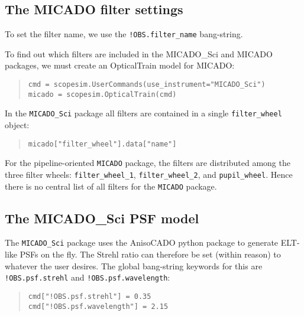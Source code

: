 \subsection{The MICADO filter settings%
  \label{the-micado-filter-settings}%
}

To set the filter name, we use the \texttt{!OBS.filter\_name} bang-string.

To find out which filters are included in the MICADO\_Sci and MICADO packages, we must create an OpticalTrain model for MICADO:

\begin{quote}
\begin{alltt}
\begin{lstlisting}[frame=single]
cmd = scopesim.UserCommands(use_instrument="MICADO_Sci")
micado = scopesim.OpticalTrain(cmd)
\end{lstlisting}
\end{alltt}
\end{quote}

In the \texttt{MICADO\_Sci} package all filters are contained in a single \texttt{filter\_wheel} object:

\begin{quote}
\begin{alltt}
\begin{lstlisting}[frame=single]
micado["filter_wheel"].data["name"]
\end{lstlisting}
\end{alltt}
\end{quote}

For the pipeline-oriented \texttt{MICADO} package, the filters are distributed among the three filter wheels:
\texttt{filter\_wheel\_1}, \texttt{filter\_wheel\_2}, and \texttt{pupil\_wheel}.
Hence there is no central list of all filters for the \texttt{MICADO} package.


\subsection{The MICADO\_Sci PSF model%
  \label{the-micado-sci-psf-model}%
}

The \texttt{MICADO\_Sci} package uses the AnisoCADO python package to generate ELT-like PSFs on the fly.
The Strehl ratio can therefore be set (within reason) to whatever the user desires.
The global bang-string keywords for this are \texttt{!OBS.psf.strehl} and \texttt{!OBS.psf.wavelength}:

\begin{quote}
\begin{alltt}
\begin{lstlisting}[frame=single]
cmd["!OBS.psf.strehl"] = 0.35
cmd["!OBS.psf.wavelength"] = 2.15
\end{lstlisting}
\end{alltt}
\end{quote}

